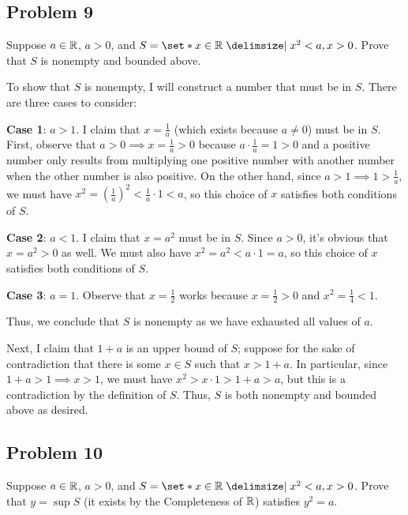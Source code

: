 \documentclass[main.tex]{subfiles}
\begin{document}
\subsection{Problem 9}
\begin{claim}
    Suppose $a \in \mathbb R$, $a > 0$, and $S = \set*{x \in \RR \mid x^2 < a, x > 0}$. Prove that $S$ is nonempty and bounded above.
\end{claim}

\begin{soln}
    To show that $S$ is nonempty, I will construct a number that must be in $S$. There are three cases to consider:
    
    \textbf{Case 1}: $a > 1$. I claim that $x = \frac{1}{a}$ (which exists because $a \neq 0$) must be in $S$. First, observe that $a > 0\implies x = \frac{1}{a} > 0$ because $a\cdot \frac{1}{a} = 1 > 0$ and a positive number only results from multiplying one positive number with another number when the other number is also positive. On the other hand, since $a > 1\implies 1 > \frac{1}{a}$, we must have $x^2 = (\frac{1}{a})^2 < \frac{1}{a} \cdot 1 < a$, so this choice of $x$ satisfies both conditions of $S$.

    \textbf{Case 2}: $a < 1$. I claim that $x = a^2$ must be in $S$. Since $a > 0$, it's obvious that $x = a^2 > 0$ as well. We must also have $x^2 = a^2 < a \cdot 1 = a$, so this choice of $x$ satisfies both conditions of $S$.

    \textbf{Case 3}: $a = 1$. Observe that $x = \frac{1}{2}$ works because $x = \frac{1}{2} > 0$ and $x^2 = \frac{1}{4} < 1$.

    Thus, we conclude that $S$ is nonempty as we have exhausted all values of $a$.
    
    Next, I claim that $1 + a$ is an upper bound of $S$; suppose for the sake of contradiction that there is some $x\in S$ such that $x > 1 + a$. In particular, since $1 + a > 1\implies x > 1$, we must have $x^2 > x \cdot 1 > 1 + a > a$, but this is a contradiction by the definition of $S$. Thus, $S$ is both nonempty and bounded above as desired.
\end{soln}
\eject

\subsection{Problem 10}
\begin{claim}
    Suppose $a \in \mathbb R$, $a > 0$, and $S = \set*{x \in \RR \mid x^2 < a, x > 0}$. Prove that $y = \sup S$ (it exists by the Completeness of $\mathbb R$) satisfies $y^2 = a$.
\end{claim}
\end{document}
